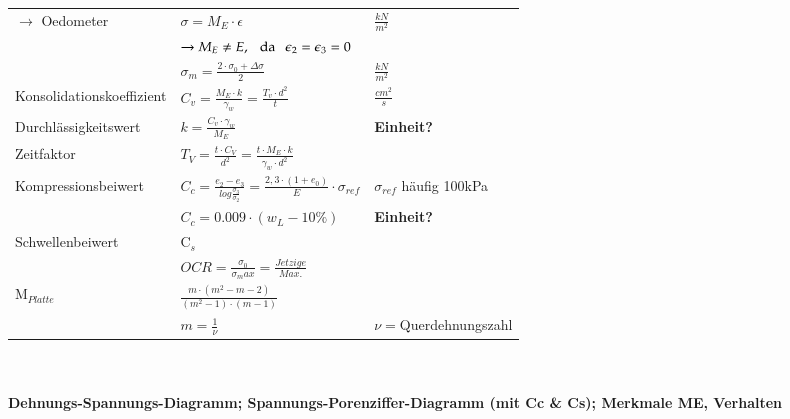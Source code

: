 \begin{minipage}{\linewidth}
\begin{tabular}{l|l|l}
		$\rightarrow$ Oedometer&$\sigma=M_E \cdot \epsilon$ &$\frac{kN}{m^2}$ \\
				&$\rightarrow M_E\neq E, \hspace{0.25cm}\text{da} \hspace{.25cm} \epsilon_2=\epsilon_3=0$& \\
				&$\sigma_m=\frac{2\cdot\sigma_0+\Delta \sigma}{2}$&$\frac{kN}{m^2}$ \\ \hline

		Konsolidationskoeffizient&$C_v=\frac{M_E\cdot k}{\gamma_w}=\frac{T_v\cdot d^2}{t}$&$\frac{cm^2}{s}$ \\ \hline

		Durchlässigkeitswert&$k=\frac{C_v\cdot\gamma_w}{M_E}$& \textbf{Einheit?} \\ \hline
		Zeitfaktor&$T_V=\frac{t\cdot C_V}{d^2}=\frac{t\cdot M_E\cdot k}{\gamma_w\cdot d^2}$& \\ \hline
	
		Kompressionsbeiwert&$C_c=\frac{e_2-e_3}{log\frac{\sigma_3}{\sigma_2}}=\frac{2,3\cdot(1+e_0)}{E}\cdot\sigma_{ref}$ &$\sigma_{ref}$ häufig 100kPa\\
				&$C_c=0.009\cdot(w_L-10\%)$					& \textbf{Einheit?} \\ 
	
		Schwellenbeiwert& C$_s$								& \\ \hline
				&$OCR=\frac{\sigma_0}{\sigma_max}=\frac{Jetzige}{Max.}$ & \\ \hline
		M$_{Platte}$ & $\frac{m\cdot (m^2-m-2)}{(m^2-1)\cdot (m-1)}$ & \\
				& $m=\frac{1}{\nu}$							& $\nu=$Querdehnungszahl \\ \hline		
	\end{tabular}
	\\
	\\
	\textbf{Dehnungs-Spannungs-Diagramm; Spannungs-Porenziffer-Diagramm (mit Cc \& Cs); Merkmale ME, Verhalten} \\
\end{minipage}


